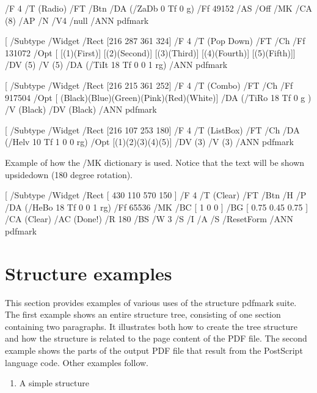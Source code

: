 \documentclass[letterpaper,12pt,english,openany,oneside]{sphinxmanual}
\begin{document}
\begin{sphinxVerbatim}[commandchars=\\\{\}]
[ /Subtype /Widget
    /Rect [ 351 360 387 396 ]
    /F 4
    /T (Radio)
    /FT /Btn
    /DA (/ZaDb 0 Tf 0 g)
    /Ff 49152
    /AS /Off
    /MK \PYGZlt{}\PYGZlt{} /CA (8)\PYGZgt{}\PYGZgt{}
    /AP \PYGZlt{}\PYGZlt{} /N \PYGZlt{}\PYGZlt{} /V4 /null \PYGZgt{}\PYGZgt{} \PYGZgt{}\PYGZgt{}
    /ANN pdfmark


[ /Subtype /Widget
    /Rect [216 287 361 324]
    /F 4
    /T (Pop Down)
    /FT /Ch
    /Ff 131072
    /Opt [ [(1)(First)] [(2)(Second)] [(3)(Third)] [(4)(Fourth)] [(5)(Fifth)]]
    /DV (5)
    /V (5)
    /DA (/TiIt 18 Tf 0 0 1 rg)
    /ANN pdfmark


[ /Subtype /Widget
    /Rect [216 215 361 252]
    /F 4
    /T (Combo)
    /FT /Ch
    /Ff 917504
    /Opt [ (Black)(Blue)(Green)(Pink)(Red)(White)]
    /DA (/TiRo 18 Tf 0 g )
    /V (Black)
    /DV (Black)
    /ANN pdfmark


[ /Subtype /Widget
    /Rect [216 107 253 180]
    /F 4
    /T (ListBox)
    /FT /Ch
    /DA (/Helv 10 Tf 1 0 0 rg)
    /Opt [(1)(2)(3)(4)(5)]
    /DV (3)
    /V (3)
    /ANN pdfmark


\PYGZpc{} Example of how the /MK dictionary is used.
\PYGZpc{} Notice that the text will be shown upside\PYGZhy{}down (180 degree rotation).

[ /Subtype /Widget
    /Rect [ 430 110 570 150 ]
    /F 4
    /T (Clear)
    /FT /Btn
    /H /P
    /DA (/HeBo 18 Tf 0 0 1 rg)
    /Ff 65536
    /MK \PYGZlt{}\PYGZlt{}
        /BC [ 1 0 0 ]
        /BG [ 0.75 0.45 0.75 ]
        /CA (Clear)
        /AC (Done!)
        /R 180
    \PYGZgt{}\PYGZgt{}
    /BS \PYGZlt{}\PYGZlt{}
        /W 3
        /S /I
        \PYGZgt{}\PYGZgt{}
    /A \PYGZlt{}\PYGZlt{} /S /ResetForm \PYGZgt{}\PYGZgt{}
    /ANN pdfmark
\end{sphinxVerbatim}


\section{Structure examples}
\label{\detokenize{pdfmark_Examples:structure-examples}}
This section provides examples of various uses of the structure pdfmark suite. The first example shows an entire structure tree, consisting of one section containing two paragraphs. It illustrates both how to create the tree structure and how the structure is related to the page content of the PDF file. The second example shows the parts of the output PDF file that result from the PostScript language code. Other examples follow.
\begin{enumerate}
%
\item {} 
A simple structure

\end{enumerate}
\end{document}
